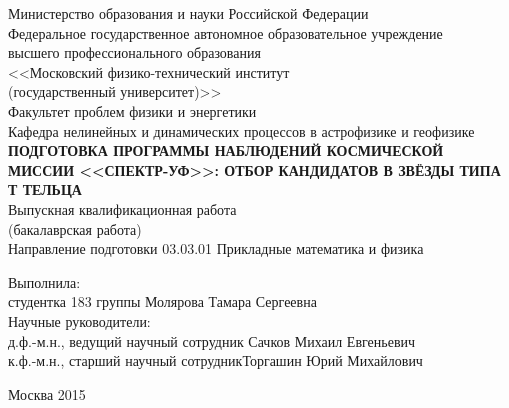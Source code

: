 \begin{titlepage}
\newpage
\begin{center}
Министерство образования и науки Российской Федерации\\
\vspace{1em} 
Федеральное государственное автономное образовательное учреждение\\
высшего профессионального образования\\
<<Московский физико-технический институт\\
(государственный университет)>>\\
\vspace{1em}
Факультет проблем физики и энергетики\\
\vspace{1em}
Кафедра нелинейных и динамических процессов в астрофизике и геофизике\\
\vspace{5em}
\textbf{\large\MakeTextUppercase{Подготовка программы наблюдений космической миссии <<Спектр-УФ>>: отбор кандидатов в звёзды типа Т Тельца}}\\
\vspace{1em}
Выпускная квалификационная работа\\
(бакалаврская работа)\\
\vspace{1em}
Направление подготовки 03.03.01 Прикладные математика и физика\\
\end{center}
\begin{flushleft}
\vspace{3em}
Выполнила:\\
студентка 183 группы \hrulefill Молярова Тамара Сергеевна\\
\vspace{3em}
Научные руководители:\\
д.ф.-м.н., ведущий научный сотрудник \hrulefill Сачков Михаил Евгеньевич\\
к.ф.-м.н., старший научный сотрудник\hrulefill Торгашин Юрий Михайлович\\
\vspace{\fill}
\end{flushleft}
\begin{center}
Москва 2015
\end{center}
\end{titlepage}